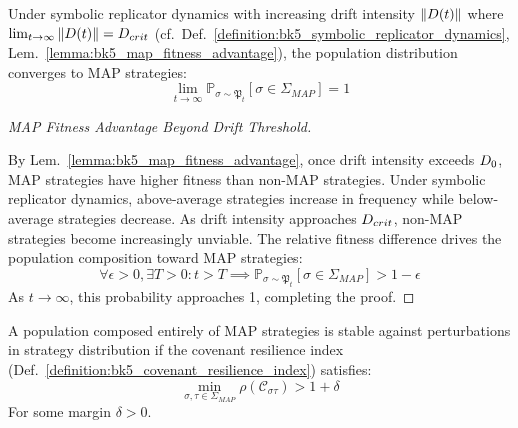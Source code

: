 \begin{corollary}
\label{corollary:bk5_convergence_to_map}
Under symbolic replicator dynamics with increasing drift intensity $\|D(t)\|$ where $\lim_{t \to \infty} \|D(t)\| = D_{crit}$ (cf.~Def.~\ref{definition:bk5_symbolic_replicator_dynamics}, Lem.~\ref{lemma:bk5_map_fitness_advantage}), the population distribution converges to MAP strategies:
\begin{equation}
\lim_{t \to \infty} \mathbb{P}_{\sigma \sim \mathfrak{P}_t}[\sigma \in \Sigma_{MAP}] = 1
\end{equation}
\end{corollary}
\begin{proof}[MAP Fitness Advantage Beyond Drift Threshold]
\label{proof:bk5_map_fitness_threshold}
\leavevmode

By Lem.~\ref{lemma:bk5_map_fitness_advantage}, once drift intensity exceeds
$D_0$, MAP strategies have higher fitness than non-MAP strategies.
Under symbolic replicator dynamics, above-average strategies increase in
frequency while below-average strategies decrease.
As drift intensity approaches $D_{crit}$, non-MAP strategies become
increasingly unviable.
The relative fitness difference drives the population composition toward MAP strategies:
\begin{equation}
\forall \epsilon > 0, \exists T > 0 : t > T \implies \mathbb{P}_{\sigma \sim \mathfrak{P}_t}[\sigma \in \Sigma_{MAP}] > 1 - \epsilon
\end{equation}
As $t \to \infty$, this probability approaches 1, completing the proof.
\end{proof}
\begin{lemma}
\label{lemma:bk5_map_population_stability}
A population composed entirely of MAP strategies is stable against perturbations in strategy distribution if the covenant resilience index (Def.~\ref{definition:bk5_covenant_resilience_index}) satisfies:
\begin{equation}
\min_{\sigma, \tau \in \Sigma_{MAP}} \rho(\mathcal{C}_{\sigma\tau}) > 1 + \delta
\end{equation}
For some margin $\delta > 0$.
\end{lemma}
